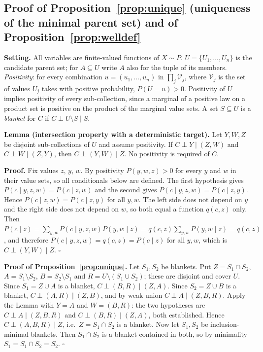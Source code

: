 \subsection{Proof of Proposition~\ref{prop:unique} (uniqueness of the minimal parent
set) and of Proposition~\ref{prop:welldef}}
\label{proof:P2}
\textbf{Setting.} All variables are finite-valued functions of $X\sim P$.
$U=\{U_1,\dots,U_n\}$ is the candidate parent set; for $A\subseteq U$ write
$A$ also for the tuple of its members. \emph{Positivity}: for every
combination $u=(u_1,\dots,u_n)$ in $\prod_j\mathcal{V}_j$, where
$\mathcal{V}_j$ is the set of values $U_j$ takes with positive probability,
$P(U=u)>0$. Positivity of $U$ implies positivity of every sub-collection,
since a marginal of a positive law on a product set is positive on the
product of the marginal value sets. A set $S\subseteq U$ is a \emph{blanket}
for $C$ if $C\perp U\setminus S\mid S$.

\textbf{Lemma (intersection property with a deterministic target).} Let
$Y,W,Z$ be disjoint sub-collections of $U$ and assume positivity. If
$C\perp Y\mid(Z,W)$ and $C\perp W\mid(Z,Y)$, then $C\perp(Y,W)\mid Z$. No
positivity is required of $C$.

\textbf{Proof.} Fix values $z$, $y$, $w$. By positivity $P(y,w,z)>0$ for every
$y$ and $w$ in their value sets, so all conditionals below are defined. The
first hypothesis gives $P(c\mid y,z,w)=P(c\mid z,w)$ and the second gives
$P(c\mid y,z,w)=P(c\mid z,y)$. Hence $P(c\mid z,w)=P(c\mid z,y)$ for all
$y,w$. The left side does not depend on $y$ and the right side does not
depend on $w$, so both equal a function $q(c,z)$ only. Then
$P(c\mid z)=\sum_{y,w}P(c\mid y,z,w)P(y,w\mid z)=q(c,z)\sum_{y,w}P(y,w\mid z)
=q(c,z)$, and therefore $P(c\mid y,z,w)=q(c,z)=P(c\mid z)$ for all $y,w$, which
is $C\perp(Y,W)\mid Z$. \hfill$\square$

\textbf{Proof of Proposition~\ref{prop:unique}.} Let $S_1,S_2$ be blankets. Put
$Z=S_1\cap S_2$, $A=S_1\setminus S_2$, $B=S_2\setminus S_1$ and
$R=U\setminus(S_1\cup S_2)$; these are disjoint and cover $U$.
Since $S_1=Z\cup A$ is a blanket, $C\perp(B,R)\mid(Z,A)$.
Since $S_2=Z\cup B$ is a blanket, $C\perp(A,R)\mid(Z,B)$, and by weak union
$C\perp A\mid(Z,B,R)$. Apply the Lemma with $Y=A$ and $W=(B,R)$: the two
hypotheses are $C\perp A\mid(Z,B,R)$ and $C\perp(B,R)\mid(Z,A)$, both
established. Hence $C\perp(A,B,R)\mid Z$, i.e.\ $Z=S_1\cap S_2$ is a blanket.
Now let $S_1,S_2$ be inclusion-minimal blankets. Then $S_1\cap S_2$ is a
blanket contained in both, so by minimality $S_1=S_1\cap S_2=S_2$.
\hfill$\square$

